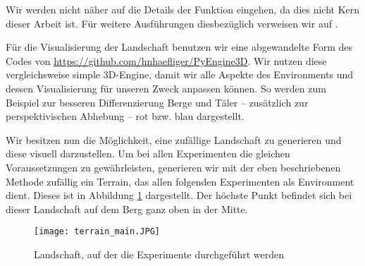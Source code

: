 Wir werden nicht näher auf die Details der Funktion eingehen, da dies nicht Kern dieser Arbeit ist. Für weitere Ausführungen diesbezüglich verweisen wir auf \cite{archer2011procedurally}.

Für die Visualisierung der Landschaft benutzen wir eine abgewandelte Form des Codes von \url{https://github.com/hnhaefliger/PyEngine3D}. Wir nutzen diese vergleichsweise simple 3D-Engine, damit wir alle Aspekte des Environments und dessen Visualisierung für unseren Zweck anpassen können. So werden zum Beispiel zur besseren Differenzierung Berge und Täler -- zusätzlich zur perspektivischen Abhebung -- rot bzw. blau dargestellt.

Wir besitzen nun die Möglichkeit, eine zufällige Landschaft zu generieren und diese visuell darzustellen. Um bei allen Experimenten die gleichen Voraussetzungen zu gewährleisten, generieren wir mit der eben beschriebenen Methode zufällig ein Terrain, das allen folgenden Experimenten als Environment dient. Dieses ist in Abbildung \ref{img:terrainMain} dargestellt. Der höchste Punkt befindet sich bei dieser Landschaft auf dem Berg ganz oben in der Mitte.

\begin{figure}[h!]
    \centering
    \texttt{[image: terrain\_main.JPG]}
    \caption{Landschaft, auf der die Experimente durchgeführt werden} \label{img:terrainMain}
\end{figure}